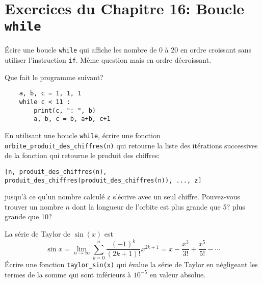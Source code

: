 \section*{Exercices du Chapitre 16: Boucle \texttt{while}}

\begin{question}
Écire une boucle \texttt{while} qui affiche les nombre de 0 à 20 en ordre
croissant sans utiliser l'instruction \texttt{if}. Même question mais en ordre
décroissant.
\end{question}

\begin{question}
Que fait le programme suivant?
\begin{verbatim}
    a, b, c = 1, 1, 1
    while c < 11 :
        print(c, ": ", b)
        a, b, c = b, a+b, c+1
\end{verbatim}
\end{question}

\begin{question}
En utilisant une boucle \texttt{while},
écrire une fonction \texttt{orbite\_produit\_des\_chiffres(n)} qui retourne
la liste des itérations successives de la fonction qui retourne le produit des
chiffres:
{\small
\begin{verbatim}
[n, produit_des_chiffres(n), produit_des_chiffres(produit_des_chiffres(n)), ..., z]
\end{verbatim}}
\noindent
jusqu'à ce qu'un nombre calculé \texttt{z} s'écrive avec un seul chiffre.
Pouvez-vous trouver un nombre $n$ dont la longueur de l'orbite est plus grande
que 5? plus grande que 10?
\end{question}

\begin{question}
La série de Taylor de $\sin(x)$ est
\[
    \sin x= \lim_{n\to\infty}\sum^{n}_{k=0} \frac{(-1)^k}{(2k+1)!} x^{2k+1} = x -
\frac{x^3}{3!} + \frac{x^5}{5!} - \cdots
\]
Écrire une fonction \texttt{taylor\_sin(x)} qui évalue la série de Taylor en
négligeant les termes de la somme qui sont inférieurs à $10^{-5}$ en valeur absolue.
\end{question}
